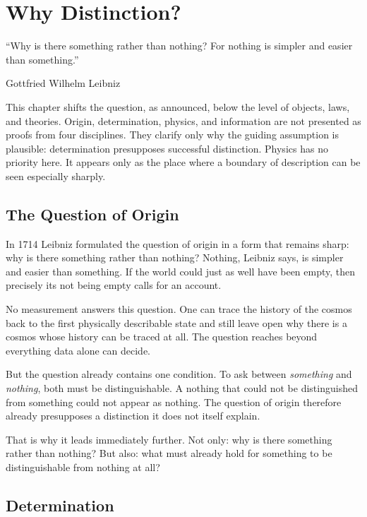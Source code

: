 \documentclass[11pt,a4paper]{book}
\begin{document}
\chapter{Why Distinction?}
\label{ch:origin-question}

\epigraph{``Why is there something rather than nothing? For nothing is
simpler and easier than something.''}{Gottfried Wilhelm Leibniz}

This chapter shifts the question, as announced, below the level of objects,
laws, and theories. Origin, determination, physics, and information are not
presented as proofs from four disciplines. They clarify only why the guiding
assumption is plausible: determination presupposes successful distinction.
Physics has no priority here. It appears only as the place where a boundary
of description can be seen especially sharply.

\section{The Question of Origin}

In 1714 Leibniz formulated the question of origin in a form that remains
sharp: why is there something rather than nothing? Nothing, Leibniz says,
is simpler and easier than something. If the world could just as well have
been empty, then precisely its not being empty calls for an account.

No measurement answers this question. One can trace the history of the cosmos
back to the first physically describable state and still leave open why there
is a cosmos whose history can be traced at all. The question reaches beyond
everything data alone can decide.

But the question already contains one condition. To ask between
\emph{something} and \emph{nothing}, both must be distinguishable. A nothing
that could not be distinguished from something could not appear as nothing.
The question of origin therefore already presupposes a distinction it does
not itself explain.

That is why it leads immediately further. Not only: why is there something
rather than nothing? But also: what must already hold for something to be
distinguishable from nothing at all?

\section{Determination}
\label{ch:description}
\end{document}
